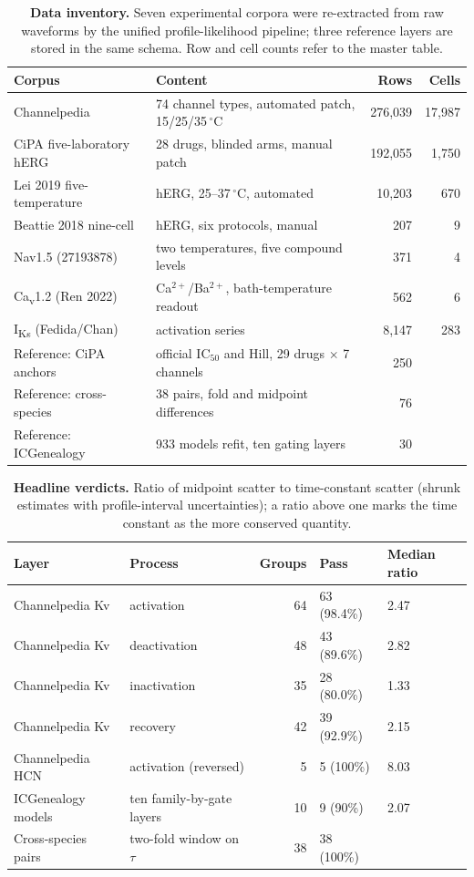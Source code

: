 \documentclass[11pt,a4paper]{article}
\begin{document}
\begin{table}[htbp]
\centering
\caption{\textbf{Data inventory.} Seven experimental corpora were re-extracted
from raw waveforms by the unified profile-likelihood pipeline; three reference
layers are stored in the same schema. Row and cell counts refer to the master table.}
\label{tab:data}
\small
\begin{tabular}{p{3.4cm}p{5.2cm}rr}
\toprule
Corpus & Content & Rows & Cells \\
\midrule
Channelpedia & 74 channel types, automated patch, 15/25/35\,$^\circ$C & 276,039 & 17,987 \\
CiPA five-laboratory hERG & 28 drugs, blinded arms, manual patch & 192,055 & 1,750 \\
Lei 2019 five-temperature & hERG, 25--37\,$^\circ$C, automated & 10,203 & 670 \\
Beattie 2018 nine-cell & hERG, six protocols, manual & 207 & 9 \\
Nav1.5 (27193878) & two temperatures, five compound levels & 371 & 4 \\
Ca\textsubscript{v}1.2 (Ren 2022) & Ca$^{2+}$/Ba$^{2+}$, bath-temperature readout & 562 & 6 \\
I\textsubscript{Ks} (Fedida/Chan) & activation series & 8,147 & 283 \\
\midrule
Reference: CiPA anchors & official IC$_{50}$ and Hill, 29 drugs $\times$ 7 channels & 250 & \\
Reference: cross-species & 38 pairs, fold and midpoint differences & 76 & \\
Reference: ICGenealogy & 933 models refit, ten gating layers & 30 & \\
\bottomrule
\end{tabular}
\end{table}

\begin{table}[htbp]
\centering
\caption{\textbf{Headline verdicts.} Ratio of midpoint scatter to time-constant
scatter (shrunk estimates with profile-interval uncertainties); a ratio above one
marks the time constant as the more conserved quantity.}
\label{tab:verdicts}
\small
\begin{tabular}{llrll}
\toprule
Layer & Process & Groups & Pass & Median ratio \\
\midrule
Channelpedia Kv & activation & 64 & 63 (98.4\%) & 2.47 \\
Channelpedia Kv & deactivation & 48 & 43 (89.6\%) & 2.82 \\
Channelpedia Kv & inactivation & 35 & 28 (80.0\%) & 1.33 \\
Channelpedia Kv & recovery & 42 & 39 (92.9\%) & 2.15 \\
Channelpedia HCN & activation (reversed) & 5 & 5 (100\%) & 8.03 \\
ICGenealogy models & ten family-by-gate layers & 10 & 9 (90\%) & 2.07 \\
Cross-species pairs & two-fold window on $\tau$ & 38 & 38 (100\%) & \\
\bottomrule
\end{tabular}
\end{table}
\end{document}
